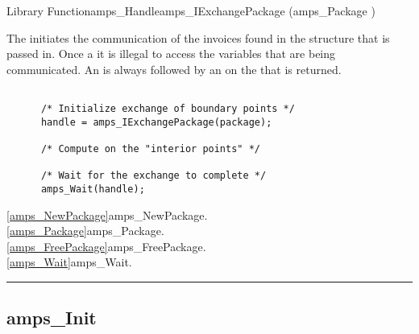 \begin{deftypefn}{Library Function}{amps_Handle}{amps\_IExchangePackage}
(amps_Package )

\DESCRIPTION

The  initiates the communication of the
invoices found in the  structure that is passed in.  Once a
 it is illegal to access the
variables that are being communicated.  An 
is always followed by an  on the  that is
returned.

\begin{display}\begin{verbatim}

      /* Initialize exchange of boundary points */
      handle = amps_IExchangePackage(package);

      /* Compute on the "interior points" */

      /* Wait for the exchange to complete */
      amps_Wait(handle);

\end{verbatim}\end{display}

\SEEALSO
\vref{amps_NewPackage}{amps\_NewPackage}. \\
\vref{amps_Package}{amps\_Package}. \\
\vref{amps_FreePackage}{amps\_FreePackage}. \\
\vref{amps_Wait}{amps\_Wait}. \\

\end{deftypefn}



\noindent\rule{\textwidth}{1mm}
\subsection{amps\_Init}
\label{amps_Init}


